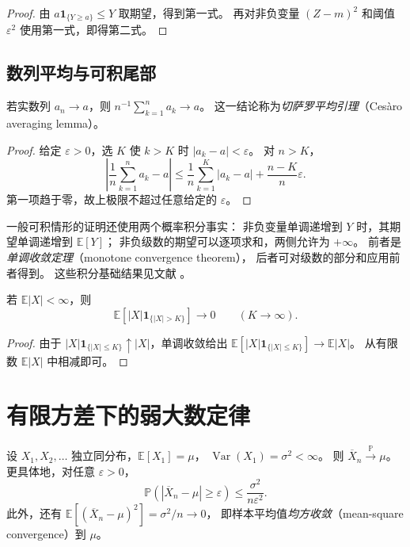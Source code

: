 \documentclass[UTF8,12pt,a4paper,fontset=fandol]{ctexart}
\begin{document}
\begin{proof}
由 $a\mathbf1_{\{Y\geq a\}}\leq Y$ 取期望，得到第一式。
再对非负变量 $(Z-m)^2$ 和阈值 $\varepsilon^2$ 使用第一式，即得第二式。
\end{proof}

\subsection{数列平均与可积尾部}

\begin{lemma}[收敛数列的平均仍收敛]
\label{lem:lln-cesaro}
若实数列 $a_n\to a$，则 $n^{-1}\sum_{k=1}^n a_k\to a$。
这一结论称为\emph{切萨罗平均引理}（Cesàro averaging lemma）。
\end{lemma}

\begin{proof}
给定 $\varepsilon>0$，选 $K$ 使 $k>K$ 时 $|a_k-a|<\varepsilon$。
对 $n>K$，
\[
  \left|\frac1n\sum_{k=1}^na_k-a\right|
  \leq\frac1n\sum_{k=1}^K|a_k-a|+\frac{n-K}{n}\varepsilon.
\]
第一项趋于零，故上极限不超过任意给定的 $\varepsilon$。
\end{proof}

一般可积情形的证明还使用两个概率积分事实：
非负变量单调递增到 $Y$ 时，其期望单调递增到 $\mathbb E[Y]$；
非负级数的期望可以逐项求和，两侧允许为 $+\infty$。
前者是\emph{单调收敛定理}（monotone convergence theorem），
后者可对级数的部分和应用前者得到。
这些积分基础结果见文献 \cite[第 1.6--1.7 节]{durrett-lln}。

\begin{lemma}[可积变量的尾部贡献趋于零]
\label{lem:lln-tail}
若 $\mathbb E|X|<\infty$，则
\[
  \mathbb E[|X|\mathbf1_{\{|X|>K\}}]\longrightarrow0
  \qquad(K\to\infty).
\]
\end{lemma}

\begin{proof}
由于 $|X|\mathbf1_{\{|X|\leq K\}}\uparrow|X|$，单调收敛给出
$\mathbb E[|X|\mathbf1_{\{|X|\leq K\}}]\to\mathbb E|X|$。
从有限数 $\mathbb E|X|$ 中相减即可。
\end{proof}

\section{有限方差下的弱大数定律}
\label{sec:lln-weak-finite}

\begin{theorem}[有限方差的弱大数定律]
\label{thm:lln-wlln-finite}
设 $X_1,X_2,\ldots$ 独立同分布，$\mathbb E[X_1]=\mu$，
$\operatorname{Var}(X_1)=\sigma^2<\infty$。
则 $\overline X_n\xrightarrow{\mathbb P}\mu$。更具体地，对任意 $\varepsilon>0$，
\begin{equation}
  \mathbb P(|\overline X_n-\mu|\geq\varepsilon)
  \leq\frac{\sigma^2}{n\varepsilon^2}.
  \label{eq:lln-wlln-bound}
\end{equation}
此外，还有 $\mathbb E[(\overline X_n-\mu)^2]=\sigma^2/n\to0$，
即样本平均值\emph{均方收敛}（mean-square convergence）到 $\mu$。
\end{theorem}
\end{document}
